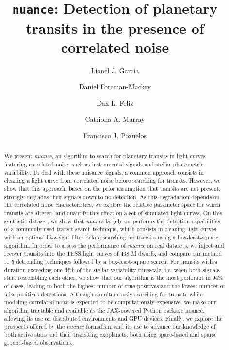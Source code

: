 \documentclass[modern]{aastex631}
\newcommand{\nuancemethod}{\textit{nuance}}
\newcommand{\nuancecode}{\textsf{nuance}}
\begin{document}
\title{\texttt{nuance}: Detection of planetary transits in the presence of correlated noise}

\author{Lionel J. Garcia}
\author{Daniel Foreman-Mackey}
\author{Dax L. Feliz}
\author{Catriona A. Murray}
\author{Francisco J. Pozuelos}


\begin{abstract}
    We present \nuancemethod{}, an algorithm to search for planetary transits in light curves featuring correlated noise, such as instrumental signals and stellar photometric variability. To deal with these nuisance signals, a common approach consists in cleaning a light curve from correlated noise before searching for transits. However, we show that this approach, based on the prior assumption that transits are not present, strongly degrades their signals down to no detection. As this degradation depends on the correlated noise characteristics, we explore the relative parameter space for which transits are altered, and quantify this effect on a set of simulated light curves. On this synthetic dataset, we show that \nuancemethod{} largely outperforms the detection capabilities of a commonly used transit search technique, which consists in cleaning light curves with an optimal bi-weight filter before searching for transits using a box-least-square algorithm. In order to assess the performance of \nuancemethod{} on real datasets, we inject and recover transits into the TESS light curves of 438 M dwarfs, and compare our method to 5 detrending techniques followed by a box-least-square search. For transits with a duration exceeding one fifth of the stellar variability timescale, i.e. when both signals start ressembling each other, we show that our algorithm is the most perforant in 94\% of cases, leading to both the highest number of true positives and the lowest number of false positives detections. Although simultaneously searching for transits while modeling correlated noise is expected to be computationaly expensive, we make our algorithm tractable and available as the \textsf{JAX}-powered Python package \href{https://github.com/lgrcia/nuance}{\nuancecode{}}, allowing its use on distributed environments and GPU devices. Finally, we explore the prospects offered by the \nuancemethod{} formalism, and its use to advance our knowledge of both active stars and their transiting exoplanets, both using space-based and sparse ground-based observations.
\end{abstract}
\end{document}
